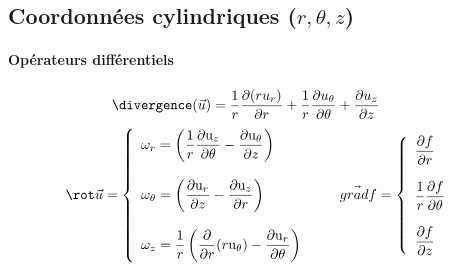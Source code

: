 \clearpage


\subsection{Coordonn\'ees cylindriques ($r,\theta,z$)}

\vspace{5mm}

\paragraph{Opérateurs différentiels}


$$
\divergence (\vec{u}) = \frac{1}{r} \dpa{(r u_r)}{r} + \frac{1}{r} \dpa{u_{\theta}}{\theta} + \dpa{u_z}{z}\qquad 
$$
$$
\rot \vec{u} =  \left\{ 
\begin{array}{l} 
\displaystyle \omega_r = \left(\frac{1}{r}\frac{\partial \mathrm{u}_z}{\partial \theta} - \frac{\partial \mathrm{u}_\theta}{\partial z}\right) 
\\ \\
\displaystyle \omega_\theta = \left(\frac{\partial \mathrm{u}_r}{\partial z} - \frac{\partial \mathrm{u}_z}{\partial r}\right) 
\\ \\
\displaystyle \omega_z = \frac{1}{r}\left(\frac{\partial}{\partial r}(r \mathrm{u}_\theta) - \frac{\partial \mathrm{u}_r}{\partial \theta}\right)\\
\end{array}
\right.
\qquad 
\vec{grad} f = 
 \left\{ 
\begin{array}{l} 
\displaystyle \frac{\partial f}{\partial r} \\ \\
\displaystyle \frac{1}{r} \frac{\partial f}{\partial \theta} \\ \\
\displaystyle \frac{\partial f}{\partial z} \\
\end{array}
\right.
$$


